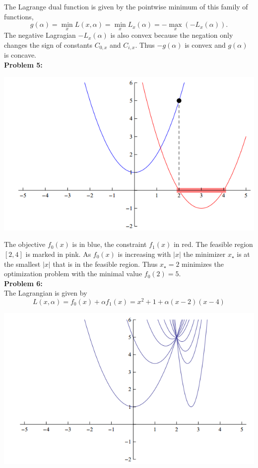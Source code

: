 \documentclass{article}
\begin{document}
The Lagrange dual function is given by the pointwise minimum of this family of functions,
$$g(\alpha) = \min_x L(x,\alpha) = \min_x L_x(\alpha) = − \max_x(−L_x(\alpha)).$$
The negative Lagragian $−L_x(\alpha)$ is also convex because the negation only changes the sign of constants $C_{0,x}$ and $C_{i,x}$. Thus $−g(\alpha)$ is convex and $g(\alpha)$ is concave.
\\

\textbf{Problem 5:} \\
\begin{center}
	\includegraphics[scale=0.3]{img1}
\end{center}
The objective $f_0(x)$ is in blue, the constraint $f_1(x)$ in red. The feasible region $[2, 4]$ is marked in pink. As $f_0(x)$ is increasing with $|x|$ the minimizer $x_{\star}$ is at the smallest $|x|$ that is in the feasible region. Thus $x_{\star} = 2$ minimizes the optimization problem with the minimal value $f_0(2) = 5$.
\\

\textbf{Problem 6:}\\
The Lagrangian is given by
$$L(x,\alpha) = f_0(x) + \alpha f_1(x) = x^2+1+\alpha(x-2)(x-4)$$
\begin{center}
	\includegraphics[scale=0.3]{img2}
\end{center}
\end{document}
